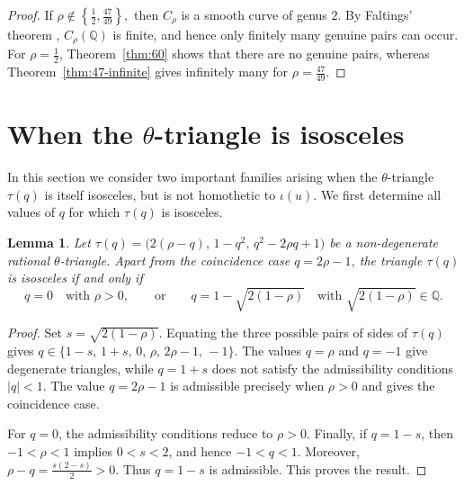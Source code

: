 \documentclass[11pt]{amsart}
\theoremstyle{plain}
\newtheorem{lem}[thm]{Lemma}
\theoremstyle{remark}
\theoremstyle{plain}
\newcommand{\Q}{\mathbb{Q}}
\begin{document}
\begin{proof}
If
$\rho\notin\left\{\frac12,\frac{47}{49}\right\},
$
then $C_\rho$ is a smooth curve of genus $2$. By Faltings' theorem \cite{Faltings,Faltings-corr},
$C_\rho(\Q)$ is finite, and hence only finitely many genuine pairs can
occur. For $\rho=\frac12$, Theorem~\ref{thm:60} shows that there are
no genuine pairs, whereas Theorem~\ref{thm:47-infinite} gives
infinitely many for $\rho=\frac{47}{49}$.
\end{proof}

\section{When the $\theta$-triangle is isosceles} \label{sec:isosceles-theta}

In this section we consider two important families arising when the
$\theta$-triangle $\tau(q)$ is itself isosceles, but is not homothetic
to $\iota(u)$. We first determine all values of $q$ for which
$\tau(q)$ is isosceles.

\begin{lem}\label{lem:iso-theta}
Let
$\tau(q) = \bigl(2(\rho-q),\,1-q^{2},\,q^{2}-2\rho q+1\bigr)$
be a non-degenerate rational $\theta$-triangle. Apart from the
coincidence case $q=2\rho-1$, the triangle $\tau(q)$ is isosceles if
and only if
\[
q=0\quad\text{with }\rho>0 ,
\qquad\text{or}\qquad
q=1-\sqrt{2(1-\rho)}
\quad\text{with }\sqrt{2(1-\rho)}\in\Q .
\]
\end{lem}

\begin{proof}
Set $
s=\sqrt{2(1-\rho)}.$
Equating the three possible pairs of sides of $\tau(q)$ gives
$q\in \{1-s,\,1+s,\,0,\,\rho,\,2\rho-1,\,-1\}$.
The values $q=\rho$ and $q=-1$ give degenerate triangles, while
$q=1+s$ does not satisfy the admissibility conditions $
|q|<1$.
The value $q=2\rho-1$ is admissible precisely when $\rho>0$ and gives
the coincidence case.

For $q=0$, the admissibility conditions reduce to $\rho>0$.
Finally, if $q=1-s$, then $-1<\rho<1$ implies $0<s<2$, and hence
$-1<q<1$. Moreover, $
\rho-q=\frac{s(2-s)}2>0.$
Thus $q=1-s$ is admissible. This proves the result.
\end{proof}
\end{document}
